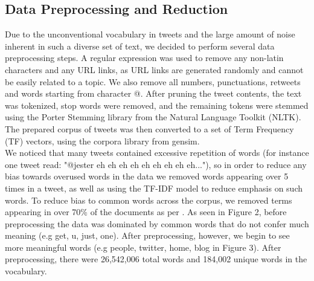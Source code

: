 \documentclass{acm_proc_article-sp}
\begin{document}
\subsection{Data Preprocessing and Reduction}
\hspace*{5mm}Due to the unconventional vocabulary in tweets and the large amount of noise inherent in such a diverse set of text, we decided to perform several data preprocessing steps. A regular expression was used to remove any non-latin characters and any URL links, as URL links are generated randomly and cannot be easily related to a topic. We also remove all numbers, punctuations, retweets and words starting from character @. After pruning the tweet contents, the text was tokenized, stop words were removed, and the remaining tokens were stemmed using the Porter Stemming library from the Natural Language Toolkit (NLTK). The prepared corpus of tweets was then converted to a set of Term Frequency (TF) vectors, using the corpora library from gensim. \\
We noticed that many tweets contained excessive repetition of words (for instance one tweet read: "@jester eh eh eh eh eh eh eh eh eh..."), so in order to reduce any bias towards overused words in the data we removed words appearing over 5 times in a tweet, as well as using the TF-IDF model to reduce emphasis on such words. To reduce bias to common words across the corpus, we removed terms appearing in over 70\% of the documents as per \cite{zhao2011comparing}. As seen in Figure 2, before preprocessing the data was dominated by common words that do not confer much meaning (e.g get, u, just, one). After preprocessing, however, we begin to see more meaningful words (e.g people, twitter, home, blog in Figure 3). After preprocessing, there were 26,542,006 total words and 184,002 unique words in the vocabulary.\\
\end{document}
